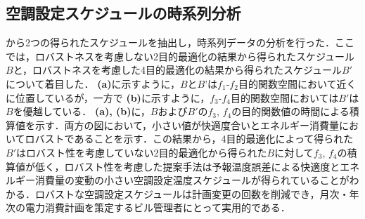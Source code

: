 \subsection{空調設定スケジュールの時系列分析}
から2つの得られたスケジュールを抽出し，時系列データの分析を行った．ここでは，ロバストネスを考慮しない2目的最適化の結果から得られたスケジュール$B$と，ロバストネスを考慮した4目的最適化の結果から得られたスケジュール$B'$について着目した． {\bf (a)}に示すように，$B$と$B’$は$f_1$-$f_2$目的関数空間において近くに位置しているが，一方で {\bf (b)}に示すように，$f_3$-$f_4$目的関数空間においては$B'$は$B$を優越している． {\bf (a), (b)}に，$B$および$B'$の$f_3$, $f_4$の目的関数値の時間による積算値を示す．両方の図において，小さい値が快適度合いとエネルギー消費量においてロバストであることを示す．この結果から，4目的最適化によって得られた$B'$はロバスト性を考慮していない2目的最適化から得られた$B$に対して$f_3$, $f_4$の積算値が低く，ロバスト性を考慮した提案手法は予報温度誤差による快適度とエネルギー消費量の変動の小さい空調設定温度スケジュールが得られていることがわかる．ロバストな空調設定スケジュールは計画変更の回数を削減でき，月次・年次の電力消費計画を策定するビル管理者にとって実用的である．


